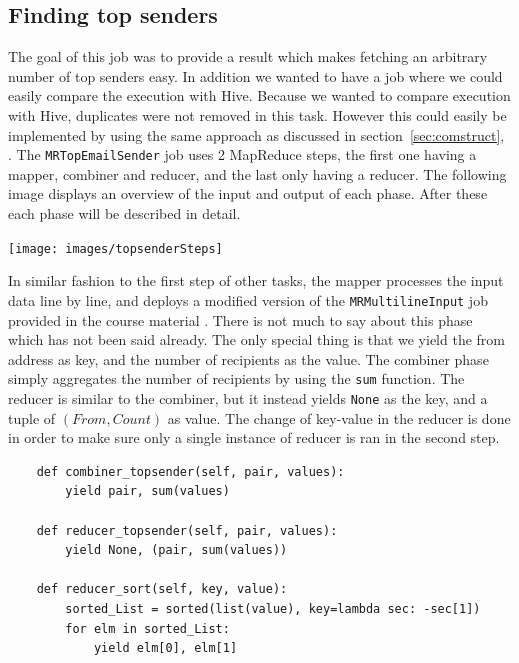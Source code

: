 \documentclass[runningheads,a4paper]{llncs}
\begin{document}
\subsection{Finding top senders}
\label{sec:topsender}
The goal of this job was to provide a result which makes fetching an arbitrary number of top senders easy. In addition we wanted to have a job where we could easily compare the execution with Hive. Because we wanted to compare execution with Hive, duplicates were not removed in this task. However this could easily be implemented by using the same approach as discussed in section~\ref{sec:comstruct}, \texttt{}.
\newline
\newline
The \verb!MRTopEmailSender! job uses 2 MapReduce steps, the first one having a mapper, combiner and reducer, and the last only having a reducer. The following image displays an overview of the input and output of each phase. After these each phase will be described in detail.
\begin{center}
		\texttt{[image: images/topsenderSteps]}
\end{center}

In similar fashion to the first step of other tasks, the mapper processes the input data line by line, and deploys a modified version of the \verb!MRMultilineInput! job provided in the course material \cite{coursematerial}. There is not much to say about this phase which has not been said already. The only special thing is that we yield the from address as key, and the number of recipients as the value.
\newline
The combiner phase simply aggregates the number of recipients by using the \verb!sum! function. The reducer is similar to the combiner, but it instead yields \verb!None! as the key, and a tuple of $(From, Count)$ as value. The change of key-value in the reducer is done in order to make sure only a single instance of reducer is ran in the second step.

\begin{verbatim}
    def combiner_topsender(self, pair, values):
        yield pair, sum(values)

    def reducer_topsender(self, pair, values):
        yield None, (pair, sum(values))

    def reducer_sort(self, key, value):
        sorted_List = sorted(list(value), key=lambda sec: -sec[1])
        for elm in sorted_List:
            yield elm[0], elm[1]
\end{verbatim}
\end{document}
